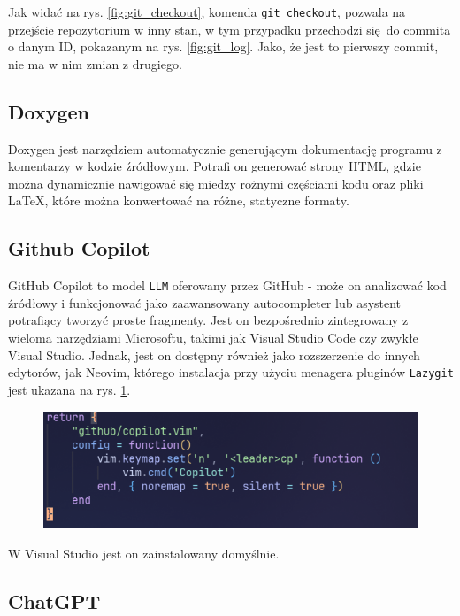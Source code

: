 Jak widać na rys. \ref{fig:git_checkout}, komenda \texttt{git checkout}, pozwala na przejście repozytorium w inny stan, w tym przypadku przechodzi się do commita o danym ID, pokazanym na rys. \ref{fig:git_log}. Jako, że jest to pierwszy commit, nie ma w nim zmian z drugiego.

\subsection{Doxygen}
Doxygen\cite{doxygensite} jest narzędziem automatycznie generującym dokumentację programu z komentarzy w kodzie źródłowym. Potrafi on generować strony HTML, gdzie można dynamicznie nawigować się miedzy rożnymi częściami kodu oraz pliki \LaTeX, które można konwertować na różne, statyczne formaty.

\subsection{Github Copilot}

GitHub Copilot\cite{copilotsite} to model \texttt{LLM} oferowany przez GitHub - może on analizować kod źródłowy i funkcjonować jako zaawansowany autocompleter lub asystent potrafiący tworzyć proste fragmenty. Jest on bezpośrednio zintegrowany z wieloma narzędziami Microsoftu, takimi jak Visual Studio Code czy zwykłe Visual Studio. Jednak, jest on dostępny również jako rozszerzenie do innych edytorów, jak Neovim, którego instalacja przy użyciu menagera pluginów \texttt{Lazygit} jest ukazana na rys. \ref{fig:copilot_install}.

\begin{figure}[H]
	\centering
	\includegraphics[width=1\textwidth]{images/copilot-plugin.png}
	\caption{}
	\label{fig:copilot_install}
\end{figure}

W Visual Studio jest on zainstalowany domyślnie.

\subsection{ChatGPT}

